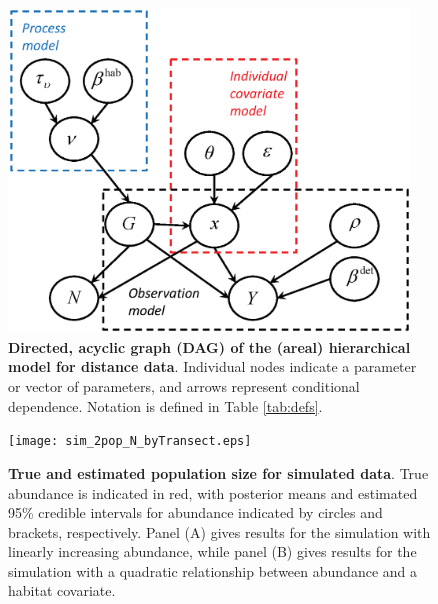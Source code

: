 \documentclass[10pt]{article}
\begin{document}

\begin{figure}
\begin{center}
\includegraphics[width=0.95\textwidth]{DAG_simple.eps}
\end{center}
\caption{{\bf Directed, acyclic graph (DAG) of the (areal) hierarchical model
for distance data}. Individual nodes indicate a parameter or vector of parameters, and arrows represent conditional dependence. Notation is defined in Table \ref{tab:defs}.}
\label{fig:DAG}
\end{figure}
\clearpage

\begin{figure}
\begin{center}
\texttt{[image: sim\_2pop\_N\_byTransect.eps]}
\end{center}
\caption{{\bf True and estimated population size for simulated data}. True abundance is indicated in red, with posterior means and estimated 95\% credible intervals for abundance indicated by circles and brackets, respectively.  Panel (A) gives results for the simulation with linearly increasing abundance, while panel (B) gives results for the simulation with a quadratic relationship between abundance and a habitat covariate.}
\label{fig:sim_N}
\end{figure}
\clearpage
\end{document}
